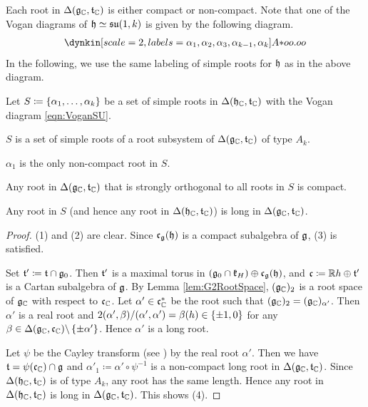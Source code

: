Each root in $\Delta(\mathfrak{g}_{\mathbb{C}}, \mathfrak{t}_{\mathbb{C}})$ is either compact or non-compact.
Note that one of the Vogan diagrams of $\mathfrak{h} \simeq \mathfrak{su}(1, k)$ is given by the following diagram.
\begin{align}
	\dynkin[scale=2, labels={\alpha_1, \alpha_2, \alpha_3, \alpha_{k-1}, \alpha_k}]{A}{*oo.oo} \label{eqn:VoganSU}
\end{align}
In the following, we use the same labeling of simple roots for $\mathfrak{h}$ as in the above diagram.

\begin{lemma} \label{lem:SimpleRootEmbeddingSU}
	Let $S \coloneq \left\{\alpha_1, \ldots, \alpha_k \right\}$ be a set of simple roots in $\Delta(\mathfrak{h}_{\mathbb{C}}, \mathfrak{t}_{\mathbb{C}})$ with the Vogan diagram \eqref{eqn:VoganSU}.
	\begin{enumparen}
		\item $S$ is a set of simple roots of a root subsystem of $\Delta(\mathfrak{g}_{\mathbb{C}}, \mathfrak{t}_{\mathbb{C}})$ of type $A_k$.
		\item $\alpha_1$ is the only non-compact root in $S$.
		\item Any root in $\Delta(\mathfrak{g}_{\mathbb{C}}, \mathfrak{t}_{\mathbb{C}})$ that is strongly orthogonal to all roots in $S$ is compact.
		\item Any root in $S$ (and hence any root in $\Delta(\mathfrak{h}_{\mathbb{C}}, \mathfrak{t}_{\mathbb{C}})$) is long in $\Delta(\mathfrak{g}_{\mathbb{C}}, \mathfrak{t}_{\mathbb{C}})$.
	\end{enumparen}
\end{lemma}

\begin{proof}
	(1) and (2) are clear.
	Since $\mathfrak{c}_{\mathfrak{g}}(\mathfrak{h})$ is a compact subalgebra of $\mathfrak{g}$, (3) is satisfied.

	Set $\mathfrak{t'} \coloneq \mathfrak{t} \cap \mathfrak{g}_0$.
	Then $\mathfrak{t'}$ is a maximal torus in $(\mathfrak{g}_0 \cap \mathfrak{k}_H) \oplus \mathfrak{c}_{\mathfrak{g}}(\mathfrak{h})$, and $\mathfrak{c} \coloneq \mathbb{R} h \oplus \mathfrak{t'}$ is a Cartan subalgebra of $\mathfrak{g}$.
	By Lemma \ref{lem:G2RootSpace}, $(\mathfrak{g}_{\mathbb{C}})_2$ is a root space of $\mathfrak{g}_{\mathbb{C}}$ with respect to $\mathfrak{c}_{\mathbb{C}}$.
	Let $\alpha' \in \mathfrak{c}_{\mathbb{C}}^*$ be the root such that $(\mathfrak{g}_{\mathbb{C}})_2 = (\mathfrak{g}_{\mathbb{C}})_{\alpha'}$.
	Then $\alpha'$ is a real root and $2(\alpha', \beta)/(\alpha', \alpha') = \beta(h) \in \left\{\pm 1, 0 \right\}$ for any $\beta \in \Delta(\mathfrak{g}_{\mathbb{C}}, \mathfrak{c}_{\mathbb{C}})\backslash\left\{\pm \alpha' \right\}$.
	Hence $\alpha'$ is a long root.

	Let $\psi$ be the Cayley transform (see \cite[Chapter VI.7]{Kn02}) by the real root $\alpha'$.
	Then we have $\mathfrak{t} =\psi(\mathfrak{c}_{\mathbb{C}}) \cap \mathfrak{g}$ and $\alpha'_1\coloneq \alpha' \circ \psi^{-1}$ is a non-compact long root in $\Delta(\mathfrak{g}_{\mathbb{C}}, \mathfrak{t}_{\mathbb{C}})$.
	Since $\Delta(\mathfrak{h}_{\mathbb{C}}, \mathfrak{t}_{\mathbb{C}})$ is of type $A_k$, any root has the same length.
	Hence any root in $\Delta(\mathfrak{h}_{\mathbb{C}}, \mathfrak{t}_{\mathbb{C}})$ is long in $\Delta(\mathfrak{g}_{\mathbb{C}}, \mathfrak{t}_{\mathbb{C}})$.
	This shows (4).
\end{proof}

